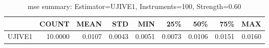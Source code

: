 \begin{table}[ht]
\centering
\caption{mse summary: Estimator=UJIVE1, Instruments=100, Strength=0.60}
\begin{tabular}{lrrrrrrrr}
\toprule
 & COUNT & MEAN & STD & MIN & 25\% & 50\% & 75\% & MAX \\
\midrule
UJIVE1 & 10.0000 & 0.0107 & 0.0043 & 0.0051 & 0.0073 & 0.0106 & 0.0151 & 0.0160 \\
\bottomrule
\end{tabular}
\end{table}
